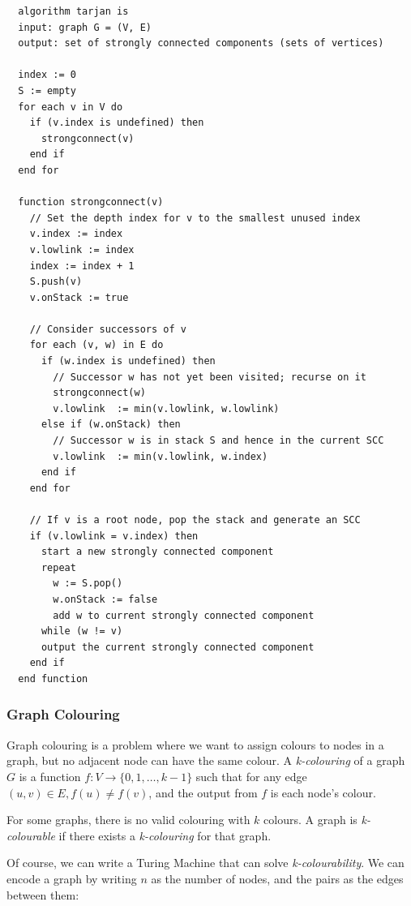 \begin{lstlisting}
  algorithm tarjan is
  input: graph G = (V, E)
  output: set of strongly connected components (sets of vertices)

  index := 0
  S := empty
  for each v in V do
    if (v.index is undefined) then
      strongconnect(v)
    end if
  end for

  function strongconnect(v)
    // Set the depth index for v to the smallest unused index
    v.index := index
    v.lowlink := index
    index := index + 1
    S.push(v)
    v.onStack := true

    // Consider successors of v
    for each (v, w) in E do
      if (w.index is undefined) then
        // Successor w has not yet been visited; recurse on it
        strongconnect(w)
        v.lowlink  := min(v.lowlink, w.lowlink)
      else if (w.onStack) then
        // Successor w is in stack S and hence in the current SCC
        v.lowlink  := min(v.lowlink, w.index)
      end if
    end for

    // If v is a root node, pop the stack and generate an SCC
    if (v.lowlink = v.index) then
      start a new strongly connected component
      repeat
        w := S.pop()
        w.onStack := false
        add w to current strongly connected component
      while (w != v)
      output the current strongly connected component
    end if
  end function
\end{lstlisting}


\subsubsection{Graph Colouring}

Graph colouring is a problem where we want to assign colours to nodes in a
graph, but no adjacent node can have the same colour. A \textit{k-colouring} of
a graph $G$ is a function $f : V \rightarrow \{ 0, 1, \dots, k - 1 \}$ such that
for any edge $(u, v) \in E, f(u) \neq f(v)$, and the output from $f$ is each
node's colour.

For some graphs, there is no valid colouring with $k$ colours. A graph is
\textit{k-colourable} if there exists a \textit{k-colouring} for that graph.

Of course, we can write a Turing Machine that can solve
\textit{k-colourability}. We can encode a graph by writing $n$ as the number of
nodes, and the pairs as the edges between them:

